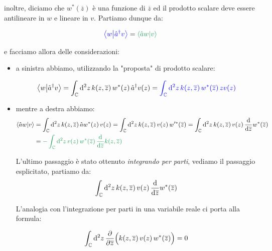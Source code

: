 	inoltre, diciamo che $w^*(\overline{z})$ è una funzione di $\overline{z}$ ed il prodotto scalare deve essere antilineare in $w$ e lineare in $v$. Partiamo dunque da:
	
\begin{align*}
	\textcolor{blue}{\braket{w}{\hat{a}^{\dagger}v}} = \textcolor{ForestGreen}{\braket{\hat{a}w}{v}}
\end{align*}
	
	e facciamo allora delle considerazioni: 
	
\begin{itemize}
	\item a sinistra abbiamo, utilizzando la "proposta" di prodotto scalare:
	
	\begin{align*}
		\braket{w}{\hat{a}^{\dagger}v} = \int_{\mathbb{C}} \dd^2 z \, k(z, \overline{z}) \, w^*(z) \, \hat{a}^{\dagger}v(z) = \textcolor{blue}{   \int_{\mathbb{C}} \dd^2 z \, k(z, \overline{z}) \, w^*(\overline{z}) \, zv(z)  }
	\end{align*}
	
	\item mentre a destra abbiamo:
	\begin{align*}
		\braket{\hat{a}w}{v} &= \int_{\mathbb{C}} \dd^2 z \, k(z, \overline{z}) \,  \hat{a}w^*(z) \,v(z) = \int_{\mathbb{C}} \dd^2 z  \, k(z, \overline{z}) \, v(z)\,  w'^*(\overline{z}) =  \int_{\mathbb{C}} \dd^2 z  \, k(z, \overline{z}) \, v(z)\,  \dv{\overline{z}} w^*(\overline{z}) \\
		& = \textcolor{ForestGreen}{ -\int_{\mathbb{C}} \dd^2 z \,v(z)  \,  w^*(\overline{z}) \, \dv{\overline{z}} k(z, \overline{z})}
	\end{align*}

\begin{myapprf}
	L'ultimo passaggio è stato ottenuto \textit{integrando per parti}, vediamo il passaggio esplicitato, partiamo da:
\begin{align*}
	\int_{\mathbb{C}} \dd^2 z  \, k(z, \overline{z}) \, v(z)\,  \dv{\overline{z}} w^*(\overline{z})
\end{align*}
	
	L’analogia con l’integrazione per parti in una variabile reale ci porta alla formula:

\begin{align*}
	\int_{\mathbb{C}} \dd^2 z  \,\pdv{\overline{z}}\qty\Big( k(z, \overline{z}) \, v(z)\,  w^*(\overline{z})) = 0
\end{align*}


\end{myapprf}
\end{itemize}
